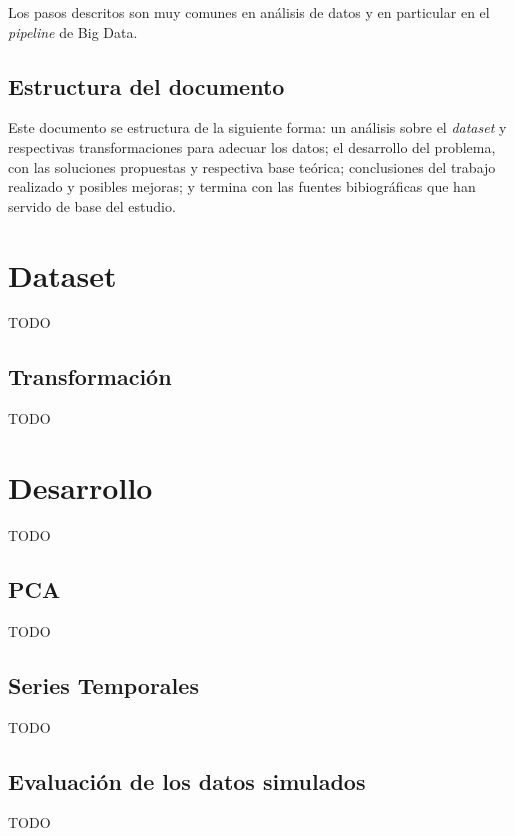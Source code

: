 \documentclass[11pt,spanish,listoffigures,listoftables]{tfgetsinf}
\begin{document}
Los pasos descritos son muy comunes en análisis de datos y en particular en el {\em pipeline} de Big Data.

\section{Estructura del documento}

Este documento se estructura de la siguiente forma: un análisis sobre el {\em dataset} y respectivas transformaciones para adecuar los datos; el desarrollo del problema, con las soluciones propuestas y respectiva base teórica; conclusiones del trabajo realizado y posibles mejoras; y termina con las fuentes bibiográficas que han servido de base del estudio.




\chapter{Dataset}
TODO

\section{Transformación}
TODO

\chapter{Desarrollo}
TODO 

\section{PCA}
TODO

\section{Series Temporales}
TODO

\section{Evaluación de los datos simulados}
TODO
\end{document}
